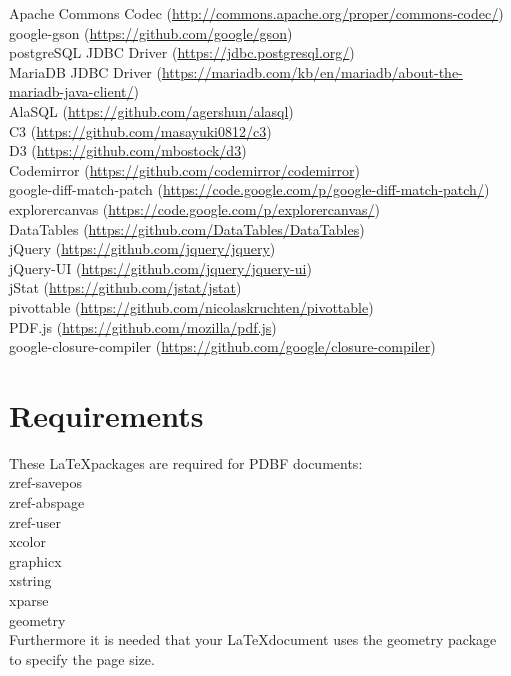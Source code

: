 \documentclass[11pt]{scrartcl}
\begin{document}
Apache Commons Codec (\url{http://commons.apache.org/proper/commons-codec/})\\
google-gson (\url{https://github.com/google/gson})\\
postgreSQL JDBC Driver (\url{https://jdbc.postgresql.org/})\\
MariaDB JDBC Driver (\url{https://mariadb.com/kb/en/mariadb/about-the-mariadb-java-client/})\\
AlaSQL (\url{https://github.com/agershun/alasql})\\
C3 (\url{https://github.com/masayuki0812/c3})\\
D3 (\url{https://github.com/mbostock/d3})\\
Codemirror (\url{https://github.com/codemirror/codemirror})\\
google-diff-match-patch (\url{https://code.google.com/p/google-diff-match-patch/})\\
explorercanvas (\url{https://code.google.com/p/explorercanvas/})\\
DataTables (\url{https://github.com/DataTables/DataTables})\\
jQuery (\url{https://github.com/jquery/jquery})\\
jQuery-UI (\url{https://github.com/jquery/jquery-ui})\\
jStat (\url{https://github.com/jstat/jstat})\\
pivottable (\url{https://github.com/nicolaskruchten/pivottable})\\
PDF.js (\url{https://github.com/mozilla/pdf.js})\\
google-closure-compiler (\url{https://github.com/google/closure-compiler})\\
\newpage
\tableofcontents
\newpage

\section{Requirements}
These \LaTeX\relax packages are required for PDBF documents:\\
zref-savepos\\
zref-abspage\\
zref-user\\
xcolor\\
graphicx\\
xstring\\
xparse\\
geometry\\

\noindent Furthermore it is needed that your \LaTeX\relax document uses the geometry package to specify the page size.\\
\end{document}
